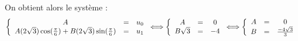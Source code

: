 \documentclass[a4paper, 11pt]{article}
\begin{document}
\begin{correction}
\begin{enumerate}
On obtient alors le système : 
$$\left\{
\begin{array}{ccc}
    A &=&u_0  \\
    A(2\sqrt{3})\cos(\frac{\pi }{6}) +B(2\sqrt{3})\sin(\frac{\pi }{6})&=&u_1
\end{array}
\right. 
\Longleftrightarrow 
\left\{
\begin{array}{ccc}
    A &=&0 \\
    B\sqrt{3} &=&-4
\end{array}
\right. 
\Longleftrightarrow 
\left\{
\begin{array}{ccc}
    A &=&0  \\
    B  &=&\frac{-4\sqrt{3}}{3}
\end{array}
\right. 
$$




        
    \end{enumerate}
\end{correction}



\vspace{0.4cm}

\end{document}
